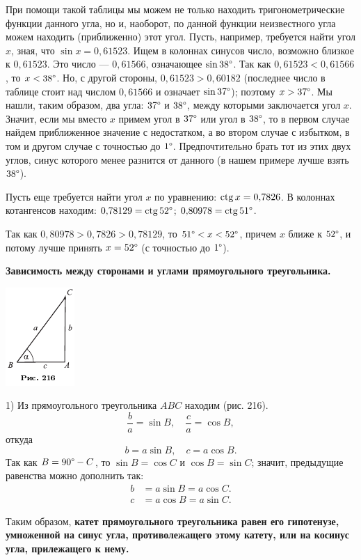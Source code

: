 \documentclass[oneside]{book}
\begin{document}
При помощи такой таблицы мы можем не только находить тригонометрические функции данного угла, но и, наоборот, по данной функции неизвестного угла можем находить (приближенно) этот угол.
Пусть, например, требуется найти угол $x$, зная, что $\sin x = 0{,}61523$.
Ищем в колоннах синусов число, возможно близкое к $0{,}61523$.
Это число — $0{,}61566$, означающее $\sin38\degree$.
Так как $0{,}61523<0{,}61566$, то $x < 38\degree$.
Но, с другой стороны, $0{,}61523>0{,}60182$ (последнее число в таблице стоит над числом $0{,}61566$ и означает $\sin37\degree$);
поэтому $x > 37\degree$.
Мы нашли, таким образом, два угла:
$37\degree$ и $38\degree$, между которыми заключается угол $x$.
Значит, если мы вместо $x$ примем угол в $37\degree$ или угол в $38\degree$, то в первом случае найдем приближенное значение с недостатком, а во втором случае с избытком, в том и другом случае с точностью до $1\degree$.
Предпочтительно брать тот из этих двух углов, синус которого менее разнится от данного (в нашем примере лучше взять $38\degree$).

Пусть еще требуется найти угол $x$ по уравнению:
$\mathrm{ctg}\, x= 0{,}7826$.
В колоннах котангенсов находим:
$0{,}78129 = \mathrm{ctg}\,52\degree$;
$0{,}80978 = \mathrm{ctg}\,51\degree$.

Так как $0{,}80978>0{,}7826>0{,}78129$, то $51\degree < x < 52\degree$, причем $x$ ближе к $52\degree$, и потому лучше принять $x = 52\degree$ (с точностью до $1\degree$).

\textbf{Зависимость между сторонами и углами прямоугольного треугольника.}

\includegraphics{pics/ris-216}

1) Из прямоугольного треугольника $ABC$ находим (рис. 216).
\[\frac ba=\sin B,
\quad 
\frac ca=\cos B,
\]
откуда
\[b=a\sin B,
\quad 
c=a\cos B.
\]
Так как $B = 90\degree-C$, то $\sin B=\cos C$ и $\cos B=\sin C$;
значит, предыдущие равенства можно дополнить так:
\begin{align*}
b&=a\sin B=a \cos C.
\\
c&=a \cos B=a \sin C.
\end{align*}

Таким образом, \textbf{катет прямоугольного треугольника равен его гипотенузе, умноженной на синус угла, противолежащего этому катету, или на косинус угла, прилежащего к нему.}
\end{document}
